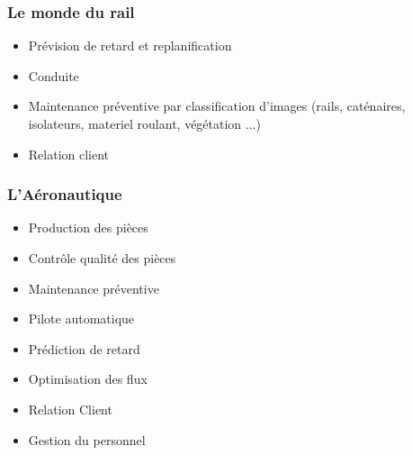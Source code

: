 \begin{frame}
  \frametitle{Le monde du rail}
  \begin{itemize}
  \item Prévision de retard et replanification
  \item Conduite
  \item Maintenance préventive par classification d'images (rails, caténaires, isolateurs, materiel roulant, végétation ...)
  \item Relation client
  \end{itemize}
\end{frame}

\begin{frame}
  \frametitle{L'Aéronautique}
  \begin{minipage}[c]{0.49\linewidth}
    \begin{itemize}
    \item Production des pièces
    \item Contrôle qualité des pièces
    \item Maintenance préventive
    \item Pilote automatique
    \item Prédiction de retard
    \item Optimisation des flux
    \item Relation Client
    \item Gestion du personnel
    \end{itemize}
  \end{minipage}\hfill
  \begin{minipage}[c]{0.49\linewidth}
  \end{minipage}\hfill
\end{frame}

